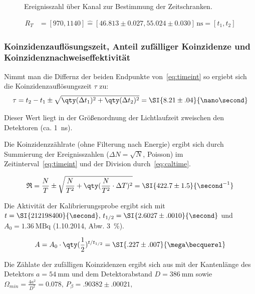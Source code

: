 \documentclass[slug=PET, room=Andreas-Schubert-Bau\,\ 424A, supervisor=Carsten\ Bittrich, coursedate=10.\ 01.\ 2020]{../../Lab_Report_LaTeX/lab_report}
\begin{document}
\begin{figure}[h]\centering
  
  \caption{Ereignisszahl \"uber Kanal zur Bestimmung der Zeitschranken.}
  \label{fig:calibration-time_range}
\end{figure}

\begin{align}
  \label{eq:timeint}
  R_T &= [970, 1140] \hat{=} [46.813\pm 0.027, 55.024\pm
        0.030]\,\si{\nano\second} = [t_1, t_2]
\end{align}

\subsubsection{Koinzidenzaufl\"osungszeit, Anteil zuf\"alliger
  Koinzidenze und Koinzidenznachweiseffektivit\"at}
\label{sec:koaufl}

Nimmt man die Differnz der beiden Endpunkte von~\eqref{eq:timeint} so
ergiebt sich die Koinzidenzaufl\"osungszeit \(\tau\) zu:
\begin{equation}
  \label{eq:koauf}
  \tau = t_2 - t_1 \pm \sqrt{\qty(\Delta t_1)^2 + \qty(\Delta t_2)^2}
  = \SI{8.21\pm .04}{\nano\second}
\end{equation}

Dieser Wert liegt in der Gr\"o\ss{}enordnung der Lichtlaufzeit
zweischen den Detektoren (ca. \SI{1}{\nano\second}).

Die Koinzidenzz\"ahlrate (ohne Filterung nach Energie) ergibt sich
durch Summierung der Ereignisszahlen (\(\Delta N = \sqrt{N}\),
Poisson) im Zeitinterval~\eqref{eq:timeint} und der Division
durch~\eqref{eq:caltime}.

\begin{equation}
  \label{eq:ctrate}
  \mathfrak{R} = \frac{N}{T} \pm \sqrt{\frac{N}{T^2} +
    \qty(\frac{N}{T^2}\cdot \Delta T)^2} = \SI{422.7\pm 1.5}{\second^{-1}}
\end{equation}

Die Aktivität der  Kalibrierungsprobe ergibt sich mit
\(t=\SI{212198400}{\second},\, t_{1/2} = \SI{2.6027\pm .0010}{\second}\) und \(A_0
= \SI{1.36}{\mega\becquerel}\) (1.10.2014, Abw. \SI{3}{\percent}).

\begin{equation}
  \label{eq:acttoday}
  A = A_0\cdot \qty(\frac{1}{2})^{t/t_{1/2}} = \SI{.227\pm.007}{\mega\becquerel}
\end{equation}

Die Z\"ahlate der zuf\"alligen Koinzidenzen ergibt sich aus
 mit der Kantenl\"ange des Detektors
\(a=\SI{54}{\milli\meter}\) und dem Detektorabstand
\(D=\SI{386}{\milli\meter}\) sowie
\(\Omega_{min} = \frac{4a^2}{D^2} = 0.078,\, P_\beta = .90382\pm
.00021,\, \)
\end{document}
